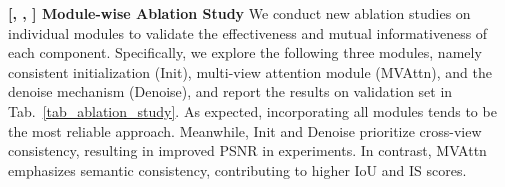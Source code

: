\documentclass[sigconf,authordraft]{acmart}
\begin{document}

\noindent \textbf{[\rone, \rthree, \rfour] Module-wise Ablation Study} We conduct new ablation studies on individual modules to validate the effectiveness and mutual informativeness of each component. Specifically, we explore the following three modules, namely consistent initialization (Init), multi-view attention module (MVAttn), and the denoise mechanism (Denoise), and report the results on validation set in Tab.~\ref{tab_ablation_study}. As expected, incorporating all modules tends to be the most reliable approach. Meanwhile, Init and Denoise prioritize cross-view consistency, resulting in improved PSNR in experiments. In contrast, MVAttn emphasizes semantic consistency, contributing to higher IoU and IS scores.


\end{document}
